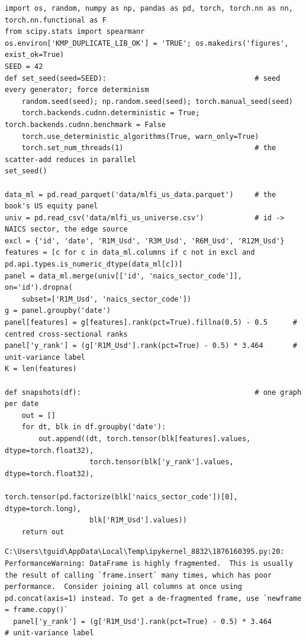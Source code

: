 \begin{verbatim}
import os, random, numpy as np, pandas as pd, torch, torch.nn as nn, torch.nn.functional as F
from scipy.stats import spearmanr
os.environ['KMP_DUPLICATE_LIB_OK'] = 'TRUE'; os.makedirs('figures', exist_ok=True)
SEED = 42
def set_seed(seed=SEED):                                   # seed every generator; force determinism
    random.seed(seed); np.random.seed(seed); torch.manual_seed(seed)
    torch.backends.cudnn.deterministic = True; torch.backends.cudnn.benchmark = False
    torch.use_deterministic_algorithms(True, warn_only=True)
    torch.set_num_threads(1)                               # the scatter-add reduces in parallel
set_seed()

data_ml = pd.read_parquet('data/mlfi_us_data.parquet')     # the book's US equity panel
univ = pd.read_csv('data/mlfi_us_universe.csv')            # id -> NAICS sector, the edge source
excl = {'id', 'date', 'R1M_Usd', 'R3M_Usd', 'R6M_Usd', 'R12M_Usd'}
features = [c for c in data_ml.columns if c not in excl and pd.api.types.is_numeric_dtype(data_ml[c])]
panel = data_ml.merge(univ[['id', 'naics_sector_code']], on='id').dropna(
    subset=['R1M_Usd', 'naics_sector_code'])
g = panel.groupby('date')
panel[features] = g[features].rank(pct=True).fillna(0.5) - 0.5      # centred cross-sectional ranks
panel['y_rank'] = (g['R1M_Usd'].rank(pct=True) - 0.5) * 3.464       # unit-variance label
K = len(features)

def snapshots(df):                                         # one graph per date
    out = []
    for dt, blk in df.groupby('date'):
        out.append((dt, torch.tensor(blk[features].values, dtype=torch.float32),
                    torch.tensor(blk['y_rank'].values, dtype=torch.float32),
                    torch.tensor(pd.factorize(blk['naics_sector_code'])[0], dtype=torch.long),
                    blk['R1M_Usd'].values))
    return out
\end{verbatim}

\begin{verbatim}
C:\Users\tguid\AppData\Local\Temp\ipykernel_8832\1876160395.py:20: PerformanceWarning: DataFrame is highly fragmented.  This is usually the result of calling `frame.insert` many times, which has poor performance.  Consider joining all columns at once using pd.concat(axis=1) instead. To get a de-fragmented frame, use `newframe = frame.copy()`
  panel['y_rank'] = (g['R1M_Usd'].rank(pct=True) - 0.5) * 3.464       # unit-variance label
\end{verbatim}

